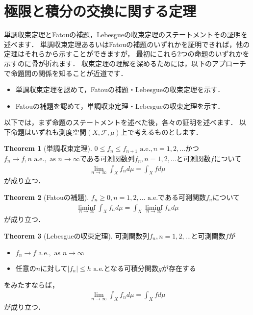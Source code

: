 \documentclass[a4paper,10pt]{jsarticle}
\theoremstyle{definition}
\newtheorem{theorem}{Theorem}
\newcommand{\eq}[1]{\begin{align}#1\end{align}}
\newcommand{\items}[1]{\begin{itemize}#1\end{itemize}}
\begin{document}
\section{極限と積分の交換に関する定理}
単調収束定理とFatouの補題，Lebesgueの収束定理のステートメントその証明を述べます．
単調収束定理あるいはFatouの補題のいずれかを証明できれば，他の定理はそれらから示すことができますが，
最初にこれら$2$つの命題のいずれかを示すのに骨が折れます．
収束定理の理解を深めるためには，以下のアプローチで命題間の関係を知ることが近道です．
\items{
	\item 単調収束定理を認めて，Fatouの補題・Lebesgueの収束定理を示す．
	\item Fatouの補題を認めて，単調収束定理・Lebesgueの収束定理を示す．}
以下では，まず命題のステートメントを述べた後，各々の証明を述べます．
以下命題はいずれも測度空間$(X,\mathcal{F},\mu)$上で考えるものとします．

\begin{theorem}[単調収束定理]
$0\le f_n\le f_{n+1}\text{ a.e.}, n=1,2,...$かつ$f_n\rightarrow f,n\text{ a.e.},\text{ as }n\rightarrow\infty$である可測関数列$f_n,n=1,2,...$と可測関数$f$について
\eq{\lim_{n\rightarrow\infty}\int_X f_nd\mu=\int_Xfd\mu}
が成り立つ．
\end{theorem}\begin{theorem}[Fatouの補題]
$f_n\ge0,n=1,2,...\text{ a.e.}$である可測関数$f_n$について
\eq{\liminf_{n\rightarrow\infty}\int_Xf_nd\mu=\int_X\liminf_{n\rightarrow\infty}f_nd\mu}
が成り立つ．
\end{theorem}\begin{theorem}[Lebesgueの収束定理]
可測関数列$f_n,n=1,2,...$と可測関数$f$が
\items{
	\item $f_n\rightarrow f\text{ a.e.},\text{ as }n\rightarrow\infty$
	\item 任意の$n$に対して$|f_n|\le h\text{ a.e.}$となる可積分関数$g$が存在する}
をみたすならば，
\eq{\lim_{n\rightarrow\infty}\int_X f_nd\mu=\int_Xfd\mu}
が成り立つ．
\end{theorem}
\end{document}

